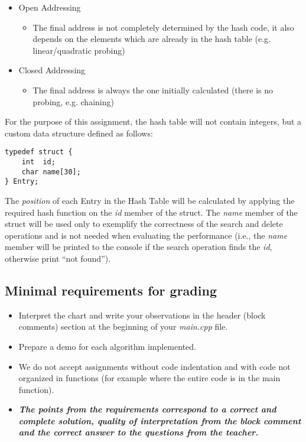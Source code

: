 \documentclass[../en-fa-lab.tex]{subfiles}
\begin{document}
\begin{itemize}
\item
  Open Addressing

  \begin{itemize}
  \item
    The final address is not completely determined by the
    hash code, it also depends on the elements which are already in the
    hash table (e.g. linear/quadratic probing)
  \end{itemize}
\item
  Closed Addressing

  \begin{itemize}
  \item
    The final address is always the one initially
    calculated (there is no probing, e.g. chaining)
  \end{itemize}
\end{itemize}

\textsubscript{\hfill\break
}

For the purpose of this assignment, the hash table will
not contain integers, but a custom data structure defined as follows:



\begin{verbatim}
typedef struct {
    int  id;
    char name[30];
} Entry;
\end{verbatim}


The \emph{position} of each Entry in the Hash Table will be calculated
by applying the required hash function on the \emph{id} member of the
struct. The \emph{name} member of the struct will be used only to
exemplify the correctness of the search and delete operations and is not
needed when evaluating the performance (i.e., the \emph{name} member
will be printed to the console if the search operation finds the
\emph{id}, otherwise print ``not found'').

\subsection{Minimal requirements for
grading}\label{minimal-requirements-for-grading}

\begin{itemize}
\item
  Interpret the chart and write your observations in the header (block
  comments) section at the beginning of your \emph{main.cpp} file.
\end{itemize}

\begin{itemize}
\item
  Prepare a demo for each algorithm implemented.
\item
  We do not accept assignments without code indentation and with code
  not organized in functions (for example where the entire code is in
  the main function).
\item
  \emph{\textbf{The points from the requirements correspond to a correct
  and complete solution, quality of interpretation from the block
  comment and the correct answer to the questions from the teacher.}}
\end{itemize}
\end{document}
